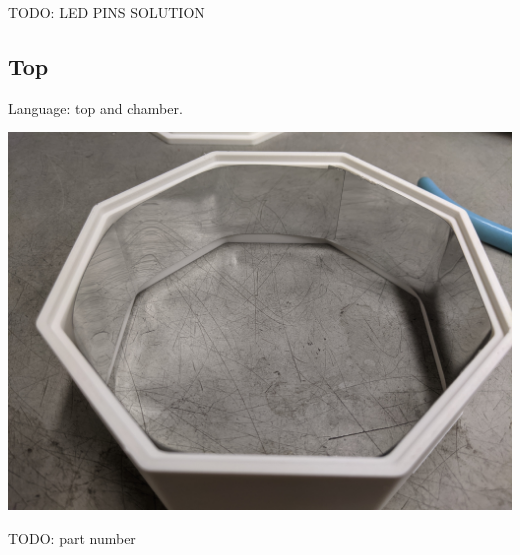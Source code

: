 \documentclass[11pt]{article}
\begin{document}
TODO: LED PINS SOLUTION

\subsection{Top}

Language: top and chamber.

\begin{center}
  \includegraphics[width=\textwidth/2]{"./reflector.jpg"}
\end{center}

TODO: part number
\end{document}
